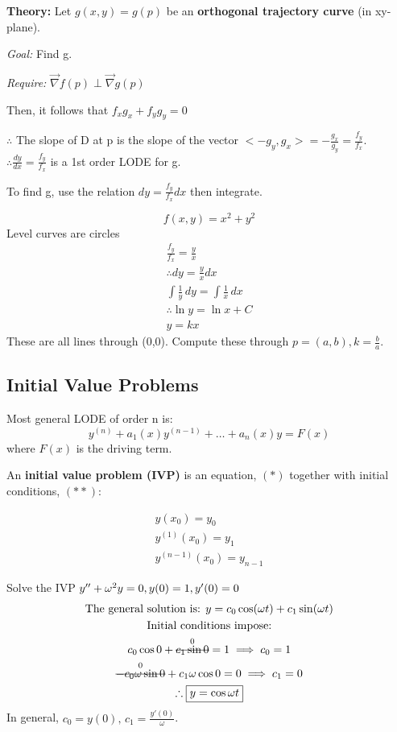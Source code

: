 \documentclass[../main.tex]{subfiles}
\begin{document}
\textbf{Theory:}
Let \( g(x,y)=g(p) \) be an \textbf{orthogonal trajectory curve} (in xy-plane).

\textit{Goal:} Find g.

\textit{Require:} \( \vec{\nabla}f(p)\perp\vec{\nabla}g(p) \)

Then, it follows that \( f_{x}g_{x}+f_{y}g_{y}=0 \)

\( \therefore \) The slope of D at p is the slope of the vector \( <-g_{y},g_{x}> =-\frac{g_{x}}{g_{y}}=\frac{f_{y}}{f_{x}} \). \\
\( \therefore \frac{dy}{dx}=\frac{f_{y}}{f_{x}} \) is a 1st order LODE for g.

To find g, use the relation \( dy=\frac{f_{y}}{f_{x}}dx \) then integrate.

\begin{example}[]
    \[ f(x,y)=x^2+y^2 \]
    Level curves are circles
    \begin{gather*}
        \frac{f_{y}}{f_{x}}=\frac{y}{x} \\
        \therefore dy=\frac{y}{x}dx \\
        \int \frac{1}{y} \, dy = \int \frac{1}{x} \, dx \\
        \therefore \ln y=\ln x + C \\
        y=kx
    \end{gather*}
    These are all lines through (0,0).
    Compute these through $p=(a,b),k=\frac{b}{a}$.
\end{example}

\subsection{Initial Value Problems}

Most general LODE of order n is:
\[ y^{(n)}+a_{1}(x)y^{(n-1)}+\dots+a_{n}(x)y=F(x) \]
where \( F(x) \) is the driving term.

An \textbf{initial value problem (IVP)} is an equation, \( (*) \) together with initial conditions, \( (* *) \):

\begin{gather*}
    y(x_{0})=y_{0} \\
    y^{(1)}(x_{0})=y_{1} \\
    y^{(n-1)}(x_{0})=y_{n-1}
\end{gather*}

\begin{example}[]
    Solve the IVP \( y''+\omega^2y=0, \space y(0)=1,\space y'(0)=0 \)
    \begin{gather*}
        \text{The general solution is: } y=c_{0}\cos(\omega t)+c_{1}\sin(\omega t) \\
        \text{Initial conditions impose:} \\
        c_{0}\cos0+\overset{0}{\msout{c_{1}\sin0}}=1 \implies c_0 = 1 \\
        \overset{0}{\msout{-c_0\omega\sin0}}+c_1\omega\cos0=0 \implies c_1 = 0 \\
        \therefore \boxed{y=\cos \omega t}
    \end{gather*}
    In general, \( c_0 = y(0),\,c_1 = \frac{y'(0)}{\omega} \).
\end{example}
\end{document}
